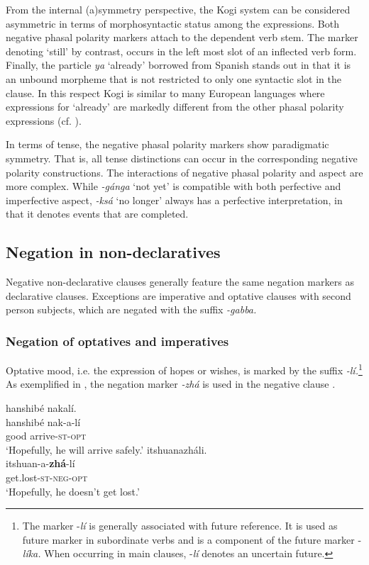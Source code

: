 \documentclass[output=paper,colorlinks,citecolor=brown]{langscibook}
\begin{document}
From the internal (a)symmetry perspective, the Kogi system can be considered asymmetric in terms of morphosyntactic status among the expressions. Both negative phasal polarity markers attach to the dependent verb stem. The marker denoting ‘still’ by contrast, occurs in the left most slot of an inflected verb form. Finally, the particle \textit{ya} ‘already’ borrowed from Spanish stands out in that it is an unbound morpheme that is not restricted to only one syntactic slot in the clause. In this respect Kogi is similar to many European languages where expressions for ‘already’ are markedly different from the other phasal polarity expressions (cf. \citealt{Auwera1998}).

In terms of tense, the negative phasal polarity markers show paradigmatic symmetry. That is, all tense distinctions can occur in the corresponding negative polarity constructions. The interactions of negative phasal polarity and aspect are more complex. While \textit{{}-gánga} ‘not yet’ is compatible with both perfective and imperfective aspect, \textit{{}-ksá} ‘no longer’ always has a perfective interpretation, in that it denotes events that are completed.

\subsection{Negation in non-declaratives}\label{sec:kog:2.2}

Negative non-declarative clauses generally feature the same negation markers as declarative clauses. Exceptions are imperative and optative clauses with second person subjects, which are negated with the suffix \textit{{}-gabba.}

\subsubsection{Negation of optatives and imperatives}\label{sec:kog:2.2.1}
 
Optative mood, i.e. the expression of hopes or wishes, is marked by the suffix \textit{{}-lí.}\footnote{The marker -\textit{lí} is generally associated with future reference. It is used as future marker in subordinate verbs and is a component of the future marker -\textit{líka.} When occurring in main clauses, -\textit{lí} denotes an uncertain future.} As exemplified in , the negation marker \textit{{}-zhá} is used in the negative clause .

\ea\label{ex:kog:27}
    \ea\label{ex:kog:27a}hanshibé  nakalí.\\
        \gll  hanshibé nak{}-a-lí\\ 
              good arrive\textsc{{}-st-opt}\\
        \glt ‘Hopefully, he will arrive safely.’
\newpage
    \ex\label{ex:kog:27b}itshuanazháli.\\
        \gll  itshuan{}-a-\textbf{zhá}-lí\\
              get.lost\textsc{-st-neg-opt}\\
        \glt  ‘Hopefully, he doesn't get lost.’
    \z
\z 
\end{document}
